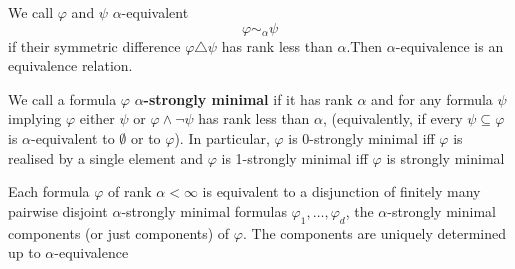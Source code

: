 \documentclass[11pt]{article}
\begin{document}
We call \(\varphi\) and \(\psi\) \(\alpha\)-equivalent
\begin{equation*}
\varphi\sim_\alpha\psi
\end{equation*}
if their symmetric difference \(\varphi\triangle\psi\) has rank less than \(\alpha\).Then \(\alpha\)-equivalence is an equivalence
relation.

We call a formula \(\varphi\) \textbf{\(\alpha\)-strongly minimal} if it has rank \(\alpha\) and for any formula \(\psi\)
implying \(\varphi\) either \(\psi\) or \(\varphi\wedge\neg\psi\) has rank less than \(\alpha\), (equivalently, if every \(\psi\subseteq\varphi\) is
\(\alpha\)-equivalent to \(\emptyset\) or to \(\varphi\)).
In particular, \(\varphi\) is 0-strongly minimal iff \(\varphi\) is realised by a
single element and \(\varphi\) is 1-strongly minimal iff \(\varphi\) is strongly minimal

\begin{lemma}[]
Each formula \(\varphi\) of rank \(\alpha<\infty\) is equivalent to a disjunction of finitely many pairwise disjoint
\(\alpha\)-strongly minimal formulas \(\varphi_1,\dots,\varphi_d\), the \(\alpha\)-strongly minimal components (or just components)
of \(\varphi\). The components are uniquely determined up to \(\alpha\)-equivalence
\end{lemma}
\end{document}
